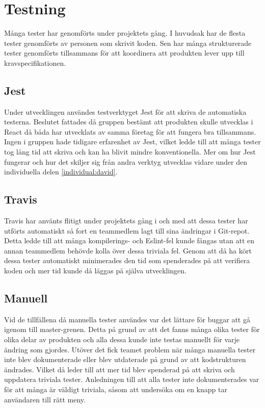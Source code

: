 \section{Testning}
Många tester har genomförts under projektets gång. I huvudsak har de flesta tester genomförts av personen som skrivit koden. Sen har många strukturerade tester genomförts tillsammans för att koordinera att produkten lever upp till kravspecifikationen. 

\subsection{Jest}
Under utvecklingen användes testverktyget Jest för att skriva de automatiska testerna. Beslutet fattades då gruppen bestämt att produkten skulle utvecklas i React då båda har utvecklats av samma företag för att fungera bra tillsammans. Ingen i gruppen hade tidigare erfarenhet av Jest, vilket ledde till att många tester tog lång tid att skriva och kan ha blivit mindre konventionella. Mer om hur Jest fungerar och hur det skiljer sig från andra verktyg utvecklas vidare under den individuella delen \ref{individual:david}.

\subsection{Travis}
Travis har använts flitigt under projektets gång i och med att dessa tester har utförts automatiskt så fort en teammedlem lagt till sina ändringar i Git-repot. Detta ledde till att många kompilerings- och Eslint-fel kunde fångas utan att en annan teammedlem behövde kolla över dessa triviala fel. Genom att då ha kört dessa tester automatiskt minimerades den tid som spenderades på att verifiera koden och mer tid kunde då läggas på själva utvecklingen. 

\subsection{Manuell}
Vid de tillfällena då manuella tester användes var det lättare för buggar att gå igenom till master-grenen. Detta på grund av att det fanns många olika tester för olika delar av produkten och alla dessa kunde inte testas manuellt för varje ändring som gjordes. Utöver det fick teamet problem när många manuella tester inte blev dokumenterade eller blev utdaterade på grund av att kodstrukturen ändrades. Vilket då leder till att mer tid blev spenderad på att skriva och uppdatera triviala tester. Anledningen till att alla tester inte dokumenterades var för att många är väldigt triviala, såsom att undersöka om en knapp tar användaren till rätt meny. 
